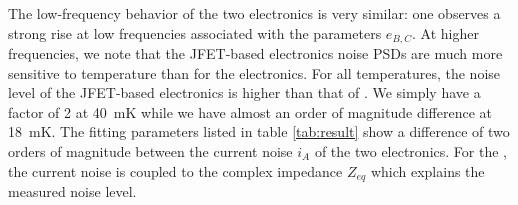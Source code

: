 The low-frequency behavior of the two electronics is very similar: one observes a strong rise at low frequencies associated with the parameters $e_{B,C}$. At higher frequencies, we note that the JFET-based electronics noise PSDs are much more sensitive to temperature than for the \Edelweiss{} electronics. For all temperatures, the noise level of the JFET-based electronics is higher than that of \Edelweiss{}. We simply have a factor of 2 at \SI{40}{\milli\kelvin} while we have almost an order of magnitude difference at \SI{18}{\milli\kelvin}. The fitting parameters listed in table \ref{tab:result} show a difference of two orders of magnitude between the current noise $i_A$ of the two electronics. For the \Edelweiss{}, the current noise is coupled to the complex impedance $Z_{eq}$ which explains the measured noise level.

